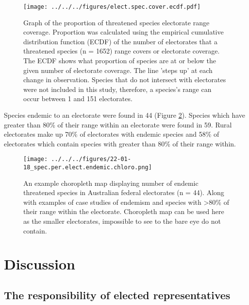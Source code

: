 \documentclass[a4paper,11pt]{article}
\begin{document}

\begin{figure}[H]
	\centering
    \texttt{[image: ../../../figures/elect.spec.cover.ecdf.pdf]}
    \caption{Graph of the proportion of threatened species electorate range coverage. Proportion was calculated using the empirical cumulative distribution function (ECDF) of the number of electorates that a threatened species (n = 1652) range covers or electorate coverage. The ECDF shows what proportion of species are at or below the given number of electorate coverage. The line 'steps up' at each change in observation. Species that do not intersect with electorates were not included in this study, therefore, a species's range can occur between 1 and 151 electorates.}
    \label{fig:hist}
\end{figure}

Species endemic to an electorate were found in 44 (Figure \ref{fig:endemic_chloro}). Species which have greater than 80\% of their range within an electorate were found in 59. Rural electorates make up 70\% of electorates with endemic species and 58\% of electorates which contain species with greater than 80\% of their range within.

\begin{figure}[H]
	\centering
    \texttt{[image: ../../../figures/22-01-18\_spec.per.elect.endemic.chloro.png]}
    \caption{An example choropleth map displaying number of endemic threatened species in Australian federal electorates (n = 44). Along with examples of case studies of endemism and species with >80\% of their range within the electorate. Choropleth map can be used here as the smaller electorates, impossible to see to the bare eye do not contain.}
    \label{fig:endemic_chloro}
\end{figure}

\section{Discussion}

\subsection{The responsibility of elected representatives}
\end{document}
